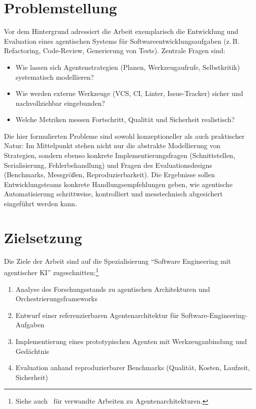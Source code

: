 \section{Problemstellung}

Vor dem Hintergrund adressiert die Arbeit exemplarisch die Entwicklung und Evaluation eines agentischen Systems für Softwareentwicklungsaufgaben (z.\,B. Refactoring, Code-Review, Generierung von Tests). Zentrale Fragen sind:

\begin{itemize}
  \item Wie lassen sich Agentenstrategien (Planen, Werkzeugaufrufe, Selbstkritik) systematisch modellieren?
  \item Wie werden externe Werkzeuge (VCS, CI, Linter, Issue-Tracker) sicher und nachvollziehbar eingebunden?
  \item Welche Metriken messen Fortschritt, Qualität und Sicherheit realistisch?
\end{itemize}
 
Die hier formulierten Probleme sind sowohl konzeptioneller als auch praktischer Natur: Im Mittelpunkt stehen nicht nur die abstrakte Modellierung von Strategien, sondern ebenso konkrete Implementierungsfragen (Schnittstellen, Serialisierung, Fehlerbehandlung) und Fragen des Evaluationsdesigns (Benchmarks, Messgrößen, Reproduzierbarkeit). Die Ergebnisse sollen Entwicklungsteams konkrete Handlungsempfehlungen geben, wie agentische Automatisierung schrittweise, kontrolliert und messtechnisch abgesichert eingeführt werden kann.
\section{Zielsetzung}

Die Ziele der Arbeit sind auf die Spezialisierung \enquote{Software Engineering mit agentischer KI} zugeschnitten:\footnote{Siehe auch~\cite{wang2023survey} für verwandte Arbeiten zu Agentenarchitekturen.}

\begin{enumerate}
  \item Analyse des Forschungsstands zu agentischen Architekturen und Orchestrierungsframeworks
  \item Entwurf einer referenzierbaren Agentenarchitektur für Software-Engineering-Aufgaben
  \item Implementierung eines prototypischen Agenten mit Werkzeuganbindung und Gedächtnis
  \item Evaluation anhand reproduzierbarer Benchmarks (Qualität, Kosten, Laufzeit, Sicherheit)
\end{enumerate}
 

